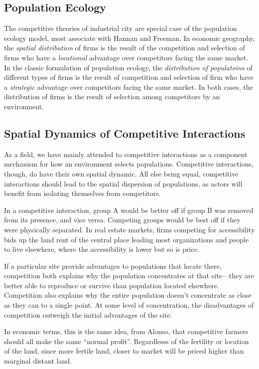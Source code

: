 \subsection*{Population Ecology}
The competitive theories of industrial city are special case of the
population ecology model, most associate with Hannan and Freeman.  In
economic geography, the \emph{spatial distribution} of firms is the
result of the competition and selection of firms who have a
\emph{locational} advantage over competitors facing the same
market. In the classic formulation of population ecology, the
\emph{distribution of populatoins} of different types of firms is the
result of competition and selection of firm who have a
\emph{strategic} advantage over competitors facing the same market. In
both cases, the distribution of firms is the result of selection
among competitors by an environment.

\subsection*{Spatial Dynamics of Competitive Interactions}
As a field, we have mainly attended to competitive interactions as a
component mechanism for how an environment selects
populations. Competitive interactions, though, do have their own
spatial dynamic. All else being equal, competitive interactions should
lead to the spatial dispersion of populations, as actors will
benefit from isolating themselves from competitors.

In a competitive interaction, group A would be better off if group B
was removed from its presence, and vice versa. Competing groups would
be best off if they were physically separated.  In real estate
markets, firms competing for accessibility bids up the land rent of
the central place leading most organizations and people to live
elsewhere, where the accessibility is lower but so is price.

If a particular site provide advantages to populations that locate
there, competition both explains why the population concentrates at
that site---they are better able to reproduce or survive than
population located elsewhere. Competition also explains why the entire
population doesn't concentrate as close as they can to a single
point. At some level of concentration, the disadvantages of competition
outweigh the initial advantages of the site.

In economic terms, this is the same idea, from Alonso, that
competitive farmers should all make the same ``normal profit''.
Regardlesss of the fertility or location of the land, since more
fertile land, closer to market will be priced higher than marginal
distant land.

